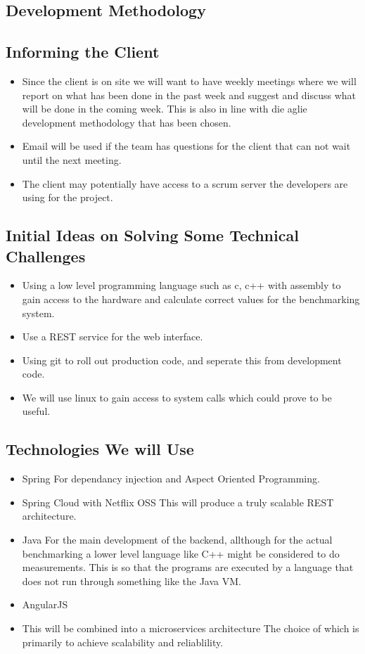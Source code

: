 \subsection{Development Methodology}


\subsection{Informing the Client}
\begin{itemize}
	\item Since the client is on site we will want to have weekly meetings where we will report on what has been done in the past week and suggest and discuss what will be done in the coming week. This is also in line with die aglie development methodology that has been chosen.
	\item Email will be used if the team has questions for the client that can not wait until the next meeting.
	\item The client may potentially have access to a scrum server the developers are using for the project.
\end{itemize}

\subsection{Initial Ideas on Solving Some Technical Challenges}
\begin{itemize}
	\item Using a low level programming language such as c, c++ with assembly to gain access to the hardware and calculate correct values for the benchmarking system.
	\item Use a REST service for the web interface.
	\item Using git to roll out production code, and seperate this from development code.
	\item We will use linux to gain access to system calls which could prove to be useful.
\end{itemize}

\subsection{Technologies We will Use}
\begin{itemize}
	\item Spring
	For dependancy injection and Aspect Oriented Programming.
	\item Spring Cloud with Netflix OSS
	This will produce a truly scalable REST architecture.
	\item Java
	For the main development of the backend, allthough for the actual benchmarking a lower level language like C++ might be considered to do measurements. This is so that the programs are executed by a language that does not run through something like the Java VM.
	\item AngularJS
	\item This will be combined into a microservices architecture
	The choice of which is primarily to achieve scalability and reliablility.
\end{itemize} 

